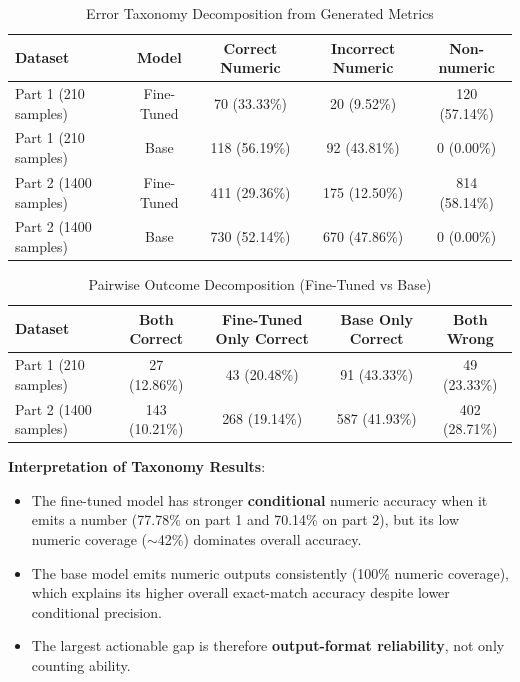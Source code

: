 \documentclass[conference]{IEEEtran}
\begin{document}
\begin{table}[t]
\centering
\caption{Error Taxonomy Decomposition from Generated Metrics}
\label{tab:error_taxonomy}
\begin{tabular}{l|c|c|c|c}
\toprule
Dataset & Model & Correct Numeric & Incorrect Numeric & Non-numeric \\
\midrule
Part 1 (210 samples) & Fine-Tuned & 70 (33.33\%) & 20 (9.52\%) & 120 (57.14\%) \\
Part 1 (210 samples) & Base & 118 (56.19\%) & 92 (43.81\%) & 0 (0.00\%) \\
\midrule
Part 2 (1400 samples) & Fine-Tuned & 411 (29.36\%) & 175 (12.50\%) & 814 (58.14\%) \\
Part 2 (1400 samples) & Base & 730 (52.14\%) & 670 (47.86\%) & 0 (0.00\%) \\
\bottomrule
\end{tabular}
\end{table}

\begin{table}[t]
\centering
\caption{Pairwise Outcome Decomposition (Fine-Tuned vs Base)}
\label{tab:pairwise_outcomes}
\begin{tabular}{l|c|c|c|c}
\toprule
Dataset & Both Correct & Fine-Tuned Only Correct & Base Only Correct & Both Wrong \\
\midrule
Part 1 (210 samples) & 27 (12.86\%) & 43 (20.48\%) & 91 (43.33\%) & 49 (23.33\%) \\
Part 2 (1400 samples) & 143 (10.21\%) & 268 (19.14\%) & 587 (41.93\%) & 402 (28.71\%) \\
\bottomrule
\end{tabular}
\end{table}

\textbf{Interpretation of Taxonomy Results}:
\begin{itemize}
    \item The fine-tuned model has stronger \textbf{conditional} numeric accuracy when it emits a number (77.78\% on part 1 and 70.14\% on part 2), but its low numeric coverage (\(\sim\)42\%) dominates overall accuracy.
    \item The base model emits numeric outputs consistently (100\% numeric coverage), which explains its higher overall exact-match accuracy despite lower conditional precision.
    \item The largest actionable gap is therefore \textbf{output-format reliability}, not only counting ability.
\end{itemize}
\end{document}
